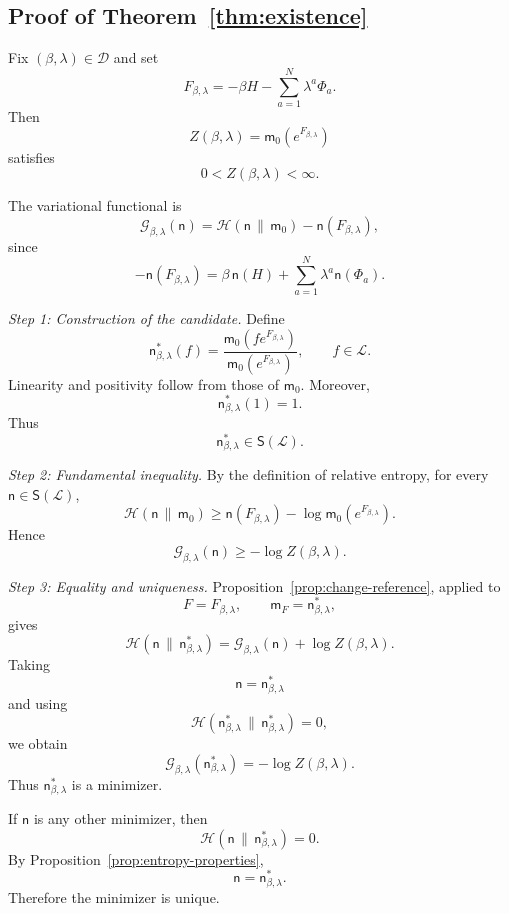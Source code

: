\documentclass[11pt,reqno]{amsart}
\begin{document}
\subsection{Proof of Theorem~\ref{thm:existence}}

Fix $(\beta,\lambda)\in\mathcal D$ and set
\[
F_{\beta,\lambda}
=
-\beta H-\sum_{a=1}^{N}\lambda^a\Phi_a.
\]
Then
\[
Z(\beta,\lambda)
=
\mathsf m_0(e^{F_{\beta,\lambda}})
\]
satisfies
\[
0<Z(\beta,\lambda)<\infty.
\]

The variational functional is
\[
\mathcal G_{\beta,\lambda}(\mathsf n)
=
\mathcal H(\mathsf n\,\|\,\mathsf m_0)
-
\mathsf n(F_{\beta,\lambda}),
\]
since
\[
-\mathsf n(F_{\beta,\lambda})
=
\beta\,\mathsf n(H)
+
\sum_{a=1}^{N}\lambda^a\mathsf n(\Phi_a).
\]

\medskip
\noindent
\textit{Step 1: Construction of the candidate.}
Define
\[
\mathsf n_{\beta,\lambda}^*(f)
=
\frac{
\mathsf m_0(fe^{F_{\beta,\lambda}})
}{
\mathsf m_0(e^{F_{\beta,\lambda}})
},
\qquad
f\in\mathcal L.
\]
Linearity and positivity follow from those of $\mathsf m_0$. Moreover,
\[
\mathsf n_{\beta,\lambda}^*(1)=1.
\]
Thus
\[
\mathsf n_{\beta,\lambda}^*\in\mathsf S(\mathcal L).
\]

\medskip
\noindent
\textit{Step 2: Fundamental inequality.}
By the definition of relative entropy, for every
$\mathsf n\in\mathsf S(\mathcal L)$,
\[
\mathcal H(\mathsf n\,\|\,\mathsf m_0)
\geq
\mathsf n(F_{\beta,\lambda})
-
\log\mathsf m_0(e^{F_{\beta,\lambda}}).
\]
Hence
\[
\mathcal G_{\beta,\lambda}(\mathsf n)
\geq
-\log Z(\beta,\lambda).
\]

\medskip
\noindent
\textit{Step 3: Equality and uniqueness.}
Proposition~\ref{prop:change-reference}, applied to
\[
F=F_{\beta,\lambda},
\qquad
\mathsf m_F=\mathsf n_{\beta,\lambda}^*,
\]
gives
\[
\mathcal H(
\mathsf n\,\|\,\mathsf n_{\beta,\lambda}^*
)
=
\mathcal G_{\beta,\lambda}(\mathsf n)
+
\log Z(\beta,\lambda).
\]
Taking
\[
\mathsf n=\mathsf n_{\beta,\lambda}^*
\]
and using
\[
\mathcal H(
\mathsf n_{\beta,\lambda}^*
\,\|\,
\mathsf n_{\beta,\lambda}^*
)=0,
\]
we obtain
\[
\mathcal G_{\beta,\lambda}
(\mathsf n_{\beta,\lambda}^*)
=
-\log Z(\beta,\lambda).
\]
Thus $\mathsf n_{\beta,\lambda}^*$ is a minimizer.

If $\mathsf n$ is any other minimizer, then
\[
\mathcal H(
\mathsf n\,\|\,\mathsf n_{\beta,\lambda}^*
)=0.
\]
By Proposition~\ref{prop:entropy-properties},
\[
\mathsf n=\mathsf n_{\beta,\lambda}^*.
\]
Therefore the minimizer is unique.
\end{document}
